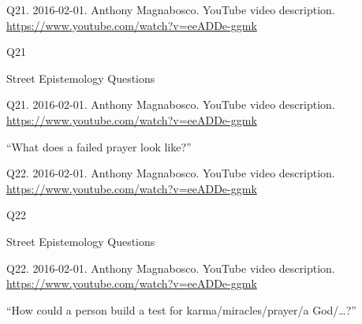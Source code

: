 \documentclass[
    src/templates/5x2-on-a4paper,
    frame
]{flashcards}
\newcommand{\myheader}{}
\newcommand{\myfooter}{
    \begin{flushright}
        \small\sc
        Street Epistemology Questions \par
    \end{flushright}
}
\begin{document}
        \renewcommand{\myheader}{
            \normalfont %
            \begin{tiny}
                Q21.
                2016-02-01.
                Anthony Magnabosco.
                    YouTube video description.
                    \\
                    \url{ https://www.youtube.com/watch?v=eeADDe-ggmk }
                \par
            \end{tiny}
        }
        \begin{flashcard}{
            \myheader
            \vspace{\fill}
            \begin{center}
                \large
                    Q21
            \end{center}
            \vspace{\fill}
            \myfooter
            \vspace{-1.4ex}
        }
            \myheader
            \vspace{\fill}
            \begin{center}
                \large
\enquote{What does a failed prayer look like?}            \end{center}
            \vspace{\fill}
        \end{flashcard}
        \renewcommand{\myheader}{
            \normalfont %
            \begin{tiny}
                Q22.
                2016-02-01.
                Anthony Magnabosco.
                    YouTube video description.
                    \\
                    \url{ https://www.youtube.com/watch?v=eeADDe-ggmk }
                \par
            \end{tiny}
        }
        \begin{flashcard}{
            \myheader
            \vspace{\fill}
            \begin{center}
                \large
                    Q22
            \end{center}
            \vspace{\fill}
            \myfooter
            \vspace{-1.4ex}
        }
            \myheader
            \vspace{\fill}
            \begin{center}
                \large
\enquote{How could a person build a test for karma\slash miracles\slash prayer\slash a God\slash \dots?}            \end{center}
            \vspace{\fill}
        \end{flashcard}
\end{document}
